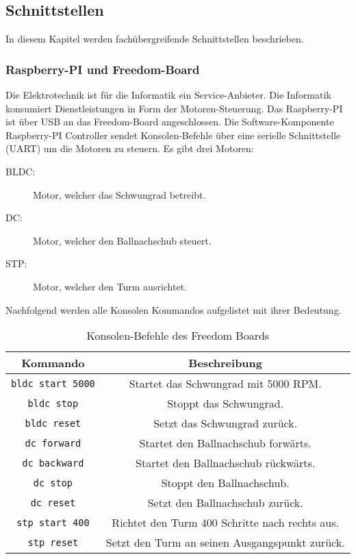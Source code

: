\subsection{Schnittstellen}
In diesem Kapitel werden fachübergreifende Schnittstellen beschrieben.

\subsubsection{Raspberry-PI und Freedom-Board}
\label{sec:schnittstelle-raspi-freedom}
Die Elektrotechnik ist für die Informatik ein Service-Anbieter. Die Informatik konsumiert Dienstleistungen in Form der Motoren-Steuerung. Das Raspberry-PI ist über USB an das Freedom-Board angeschlossen. Die Software-Komponente Raspberry-PI Controller sendet Konsolen-Befehle über eine serielle Schnittstelle (UART) um die Motoren zu steuern. Es gibt drei Motoren:

\begin{description}
	\item[BLDC:] Motor, welcher das Schwungrad betreibt.
	\item[DC:] Motor, welcher den Ballnachschub steuert.
	\item[STP:] Motor, welcher den Turm ausrichtet.
\end{description}

\noindent
Nachfolgend werden alle Konsolen Kommandos aufgelistet mit ihrer Bedeutung. \\

\begin{table}[h!]
	\centering
	\renewcommand{\arraystretch}{1.5}
	\begin{tabular}{|c|c|}
		\hline \textbf{Kommando}  & \textbf{Beschreibung} \\ 
		\hline \texttt{bldc start 5000}  & Startet das Schwungrad mit 5000 RPM. \\ 
		\hline \texttt{bldc stop} & Stoppt das Schwungrad.  \\ 
		\hline \texttt{bldc reset} & Setzt das Schwungrad zurück. \\ 
		\hline \texttt{dc forward} & Startet den Ballnachschub forwärts. \\ 
		\hline \texttt{dc backward} & Startet den Ballnachschub rückwärts. \\ 
		\hline \texttt{dc stop} & Stoppt den Ballnachschub. \\ 
	    \hline \texttt{dc reset} & Setzt den Ballnachschub zurück. \\ 
	    \hline \texttt{stp start 400} & Richtet den Turm 400 Schritte nach rechts aus. \\ 
	    \hline \texttt{stp reset} & Setzt den Turm an seinen Ausgangspunkt zurück. \\ 
		\hline 
	\end{tabular} 
	\caption{Konsolen-Befehle des Freedom Boards}
	\label{tab:freedom-board-konsolen-befehle}
\end{table}

